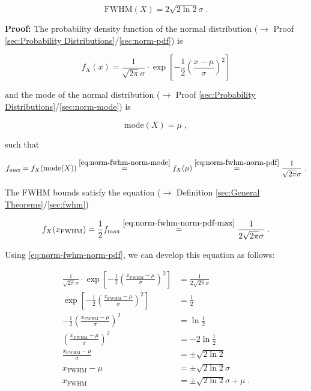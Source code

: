 \documentclass[a4paper,12pt,twoside]{book}
\begin{document}
\begin{equation} \label{eq:norm-fwhm-norm-fwhm}
\mathrm{FWHM}(X) = 2 \sqrt{2 \ln 2} \sigma \; .
\end{equation}


\vspace{1em}
\textbf{Proof:} The probability density function of the normal distribution ($\rightarrow$ Proof \ref{sec:Probability Distributions}/\ref{sec:norm-pdf}) is

\begin{equation} \label{eq:norm-fwhm-norm-pdf}
f_X(x) = \frac{1}{\sqrt{2 \pi} \sigma} \cdot \exp \left[ -\frac{1}{2} \left( \frac{x-\mu}{\sigma} \right)^2 \right]
\end{equation}

and the mode of the normal distribution ($\rightarrow$ Proof \ref{sec:Probability Distributions}/\ref{sec:norm-mode}) is

\begin{equation} \label{eq:norm-fwhm-norm-mode}
\mathrm{mode}(X) = \mu \; ,
\end{equation}

such that

\begin{equation} \label{eq:norm-fwhm-norm-pdf-max}
f_\mathrm{max} = f_X(\mathrm{mode}(X)) \overset{\eqref{eq:norm-fwhm-norm-mode}}{=} f_X(\mu) \overset{\eqref{eq:norm-fwhm-norm-pdf}}{=} \frac{1}{\sqrt{2 \pi} \sigma} \; .
\end{equation}

The FWHM bounds satisfy the equation ($\rightarrow$ Definition \ref{sec:General Theorems}/\ref{sec:fwhm})

\begin{equation} \label{eq:norm-fwhm-x-FHWM}
f_X(x_\mathrm{FWHM}) = \frac{1}{2} f_\mathrm{max} \overset{\eqref{eq:norm-fwhm-norm-pdf-max}}{=} \frac{1}{2 \sqrt{2 \pi} \sigma} \; .
\end{equation}

Using \eqref{eq:norm-fwhm-norm-pdf}, we can develop this equation as follows:

\begin{equation} \label{eq:norm-fwhm-x-FHWM-s1}
\begin{split}
\frac{1}{\sqrt{2 \pi} \sigma} \cdot \exp \left[ -\frac{1}{2} \left( \frac{x_\mathrm{FWHM}-\mu}{\sigma} \right)^2 \right] &= \frac{1}{2 \sqrt{2 \pi} \sigma} \\
\exp \left[ -\frac{1}{2} \left( \frac{x_\mathrm{FWHM}-\mu}{\sigma} \right)^2 \right] &= \frac{1}{2} \\
-\frac{1}{2} \left( \frac{x_\mathrm{FWHM}-\mu}{\sigma} \right)^2 &= \ln \frac{1}{2} \\
\left( \frac{x_\mathrm{FWHM}-\mu}{\sigma} \right)^2 &= -2 \ln \frac{1}{2} \\
\frac{x_\mathrm{FWHM}-\mu}{\sigma} &= \pm \sqrt{2 \ln 2} \\
x_\mathrm{FWHM}-\mu &= \pm \sqrt{2 \ln 2} \sigma \\
x_\mathrm{FWHM} &= \pm \sqrt{2 \ln 2} \sigma + \mu \; .
\end{split}
\end{equation}
\end{document}
